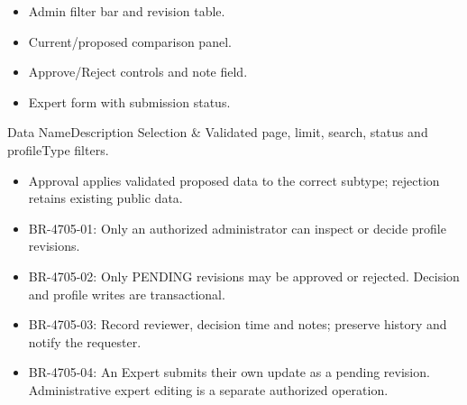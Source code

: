 \begin{itemize}[leftmargin=1.6em,topsep=3pt,itemsep=2pt,parsep=0pt,label=$\bullet$]
    \item Admin filter bar and revision table.
    \item Current/proposed comparison panel.
    \item Approve/Reject controls and note field.
    \item Expert form with submission status.
\end{itemize}


\begin{specdatatable}{Data Name}{Description}
Selection & Validated page, limit, search, status and profileType filters.\\ \hline
\end{specdatatable}

\begin{itemize}[leftmargin=1.6em,topsep=3pt,itemsep=2pt,parsep=0pt,label=$\bullet$]
    \item Approval applies validated proposed data to the correct subtype; rejection retains existing public data.
\end{itemize}

\begin{itemize}[leftmargin=1.6em,topsep=3pt,itemsep=2pt,parsep=0pt,label=$\bullet$]\brrulelist
    \item BR-4705-01: Only an authorized administrator can inspect or decide profile revisions.
    \item BR-4705-02: Only PENDING revisions may be approved or rejected. Decision and profile writes are transactional.
    \item BR-4705-03: Record reviewer, decision time and notes; preserve history and notify the requester.
    \item BR-4705-04: An Expert submits their own update as a pending revision. Administrative expert editing is a separate authorized operation.
\end{itemize}

